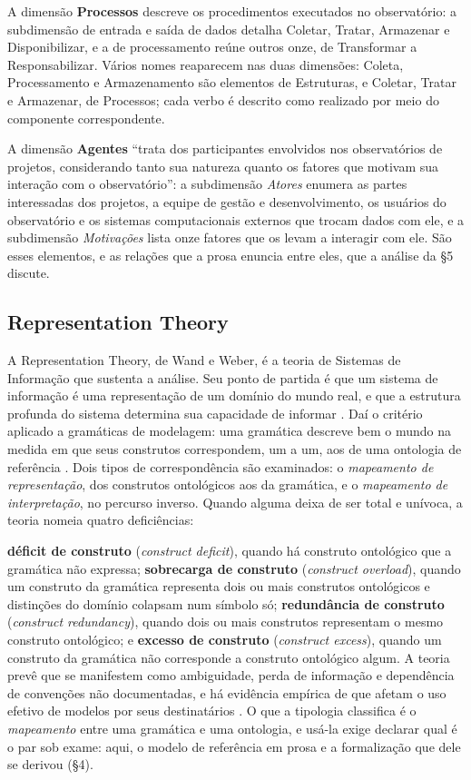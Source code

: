 A dimensão \textbf{Processos} descreve os procedimentos executados no observatório: a subdimensão de entrada e saída de dados detalha Coletar, Tratar, Armazenar e Disponibilizar, e a de processamento reúne outros onze, de Transformar a Responsabilizar. Vários nomes reaparecem nas duas dimensões: Coleta, Processamento e Armazenamento são elementos de Estruturas, e Coletar, Tratar e Armazenar, de Processos; cada verbo é descrito como realizado por meio do componente correspondente.

A dimensão \textbf{Agentes} ``trata dos participantes envolvidos nos observatórios de projetos, considerando tanto sua natureza quanto os fatores que motivam sua interação com o observatório'': a subdimensão \textit{Atores} enumera as partes interessadas dos projetos, a equipe de gestão e desenvolvimento, os usuários do observatório e os sistemas computacionais externos que trocam dados com ele, e a subdimensão \textit{Motivações} lista onze fatores que os levam a interagir com ele. São esses elementos, e as relações que a prosa enuncia entre eles, que a análise da \S{}5 discute.

\subsection{Representation Theory}

A Representation Theory, de Wand e Weber, é a teoria de Sistemas de Informação que sustenta a análise. Seu ponto de partida é que um sistema de informação é uma representação de um domínio do mundo real, e que a estrutura profunda do sistema determina sua capacidade de informar \cite{wand1995deep}. Daí o critério aplicado a gramáticas de modelagem: uma gramática descreve bem o mundo na medida em que seus construtos correspondem, um a um, aos de uma ontologia de referência \cite{wand1993ontological,weber1997ontological}. Dois tipos de correspondência são examinados: o \textit{mapeamento de representação}, dos construtos ontológicos aos da gramática, e o \textit{mapeamento de interpretação}, no percurso inverso. Quando alguma deixa de ser total e unívoca, a teoria nomeia quatro deficiências:

\textbf{déficit de construto} (\textit{construct deficit}), quando há construto ontológico que a gramática não expressa; \textbf{sobrecarga de construto} (\textit{construct overload}), quando um construto da gramática representa dois ou mais construtos ontológicos e distinções do domínio colapsam num símbolo só; \textbf{redundância de construto} (\textit{construct redundancy}), quando dois ou mais construtos representam o mesmo construto ontológico; e \textbf{excesso de construto} (\textit{construct excess}), quando um construto da gramática não corresponde a construto ontológico algum. A teoria prevê que se manifestem como ambiguidade, perda de informação e dependência de convenções não documentadas, e há evidência empírica de que afetam o uso efetivo de modelos por seus destinatários \cite{recker2011ontological}. O que a tipologia classifica é o \textit{mapeamento} entre uma gramática e uma ontologia, e usá-la exige declarar qual é o par sob exame: aqui, o modelo de referência em prosa e a formalização que dele se derivou (\S{}4).

